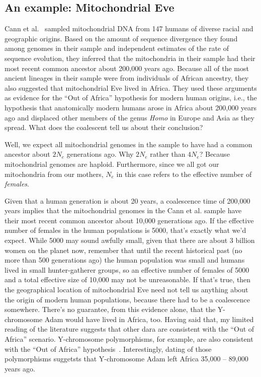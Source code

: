 \subsection*{An example: Mitochondrial
  Eve}

Cann et al.~\cite{Cann-etal-1987} sampled mitochondrial DNA from 147
humans of diverse racial and geographic origins. Based on the amount
of sequence divergence they found among genomes in their sample and
independent estimates of the rate of sequence evolution, they inferred
that the mitochondria in their sample had their most recent common
ancestor about 200,000 years ago. Because all of the most ancient
lineages in their sample were from individuals of African ancestry,
they also suggested that mitochondrial Eve lived in Africa. They used
these arguments as evidence for the ``Out of Africa'' hypothesis for
modern human origins, i.e., the hypothesis that anatomically modern
humans arose in Africa about 200,000 years ago and displaced other
members of the genus {\it Homo\/} in Europe and Asia as they
spread. What does the coalescent tell us about their conclusion?

Well, we expect all mitochondrial genomes in the sample to have had a
common ancestor about $2N_e$ generations ago. Why $2N_e$ rather than
$4N_e$? Because mitochondrial genomes are haploid. Furthermore, since
we all got our mitochondria from our mothers, $N_e$ in this case
refers to the effective number of {\it females}.

Given that a human generation is about 20 years, a coalescence time of
200,000 years implies that the mitochondrial genomes in the Cann et
al. sample have their most recent common ancestor about 10,000
generations ago. If the effective number of females in the human
populations is 5000, that's exactly what we'd expect. While 5000 may
sound awfully small, given that there are about 3 billion women on the
planet now, remember that until the recent historical past (no more
than 500 generations ago) the human population was small and humans
lived in small hunter-gatherer groups, so an effective number of
females of 5000 and a total effective size of 10,000 may not be
unreasonable. If that's true, then the geographical location of
mitochondrial Eve need not tell us anything about the origin of modern
human populations, because there had to be a coalescence
somewhere. There's no guarantee, from this evidence alone, that the
Y-chromosome Adam would have lived in Africa, too. Having said that,
my limited reading of the literature suggests that other dara are
consistent with the ``Out of Africa'' scenario. Y-chromosome
polymorphisms, for example, are also consistent with the ``Out of
Africa'' hypothesis~\cite{Underhill-etal-2000}. Interestingly, dating
of those polymorphisms suggetsts that Y-chromosome Adam left Africa
35,000 -- 89,000 years ago.

